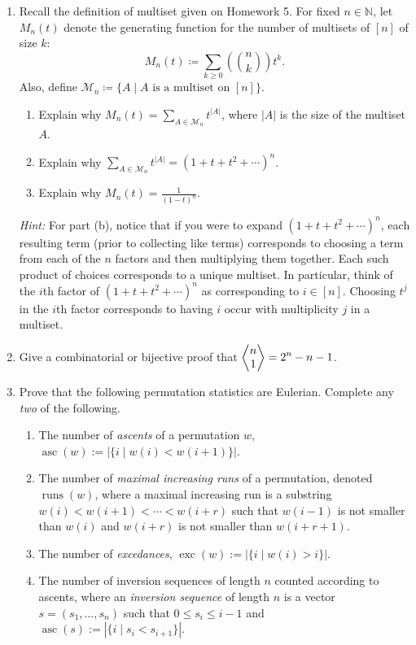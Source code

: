 \documentclass[11pt]{article}%
\theoremstyle{definition}
\DeclareMathOperator{\asc}{asc}
\DeclareMathOperator{\runs}{runs}
\DeclareMathOperator{\exc}{exc}
\newcommand{\euler}[2]{
  \displaystyle \left\langle\begin{matrix}#1  \\#2  \\ \end{matrix}\right\rangle}
\begin{document}
\begin{enumerate}

\item Recall the definition of multiset given on Homework 5.  For fixed $n\in \mathbb{N}$, let $M_n(t)$ denote the generating function for the number of multisets of $[n]$ of size $k$:
\[
M_n(t)\coloneqq \sum_{k\geq 0}\left(\binom{n}{k}\right)t^k.
\]
Also, define $\mathcal{M}_n\coloneqq \{A\mid A\text{ is a multiset on }[n]\}$.
\begin{enumerate}
\item Explain why $\displaystyle M_n(t)=\sum_{A\in\mathcal{M}_n} t^{|A|}$, where $|A|$ is the size of the multiset $A$.
\item Explain why $\displaystyle \sum_{A\in\mathcal{M}_n} t^{|A|}=(1+t+t^2+\cdots)^n$.
\item Explain why $\displaystyle M_n(t)=\frac{1}{(1-t)^n}$.
\end{enumerate}
\emph{Hint:} For part (b), notice that if you were to expand $(1+t+t^2+\cdots)^n$, each resulting term (prior to collecting like terms) corresponds to choosing a term from each of the $n$ factors and then multiplying them together.  Each such product of choices corresponds to a unique multiset.  In particular, think of the $i$th factor of $(1+t+t^2+\cdots)^n$ as corresponding to $i\in [n]$.  Choosing $t^j$ in the $i$th factor corresponds to having $i$ occur with multiplicity $j$ in a multiset.
\item Give a combinatorial or bijective proof that $\displaystyle \euler{n}{1}=2^n-n-1$.

\item Prove that the following permutation statistics are Eulerian. Complete any \emph{two} of the following.  
\begin{enumerate}
\item The number of \emph{ascents} of a permutation $w$, $\asc(w):=|\{i\mid w(i)<w(i+1)\}|$.
\item The number of \emph{maximal increasing runs} of a permutation, denoted $\runs(w)$, where a maximal increasing run is a substring $w(i)<w(i+1)<\cdots < w(i+r)$ such that $w(i-1)$ is not smaller than $w(i)$ and $w(i+r)$ is not smaller than $w(i+r+1)$.
\item The number of \emph{excedances}, $\exc(w):=|\{i\mid w(i)>i\}|$.
\item The number of inversion sequences of length $n$ counted according to ascents, where an \emph{inversion sequence} of length $n$ is a vector $s=(s_1,\ldots,s_n)$ such that $0\leq s_i\leq i-1$ and $\asc(s):=|\{i\mid s_i<s_{i+1}\}|$.
\end{enumerate}


\end{enumerate}
\end{document}
